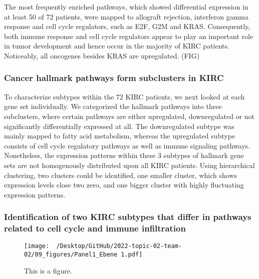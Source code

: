 \documentclass[
  parskip,
  oneside]{scrreprt}
\begin{document}
The most frequently enriched pathways, which showed differential
expression in at least 50 of 72 patients, were mapped to allograft
rejection, interferon gamma response and cell cycle regulators, such as
E2F, G2M and KRAS. Consequently, both immune response and cell cycle
regulators appear to play an important role in tumor development and
hence occur in the majority of KIRC patients. Noticeably, all oncogenes
besides KRAS are upregulated. (FIG)

\hypertarget{cancer-hallmark-pathways-form-subclusters-in-kirc}{%
\subsubsection{Cancer hallmark pathways form subclusters in
KIRC}\label{cancer-hallmark-pathways-form-subclusters-in-kirc}}

To characterize subtypes within the 72 KIRC patients, we next looked at
each gene set individually. We categorized the hallmark pathways into
three subclusters, where certain pathways are either upregulated,
downregulated or not significantly differentially expressed at all. The
downregulated subtype was mainly mapped to fatty acid metabolism,
whereas the upregulated subtype consists of cell cycle regulatory
pathways as well as immune signaling pathways. Nonetheless, the
expression patterns within these 3 subtypes of hallmark gene sets are
not homogenously distributed upon all KIRC patients. Using hierarchical
clustering, two clusters could be identified, one smaller cluster, which
shows expression levels close two zero, and one bigger cluster with
highly fluctuating expression patterns.

\hypertarget{identification-of-two-kirc-subtypes-that-differ-in-pathways-related-to-cell-cycle-and-immune-infiltration}{%
\subsubsection{Identification of two KIRC subtypes that differ in
pathways related to cell cycle and immune
infiltration}\label{identification-of-two-kirc-subtypes-that-differ-in-pathways-related-to-cell-cycle-and-immune-infiltration}}

\begin{figure}
  \texttt{[image: ~/Desktop/GitHub/2022-topic-02-team-02/09\_figures/Panel1\_Ebene 1.pdf]}
  \caption{This is a figure.}
\end{figure}
\end{document}

